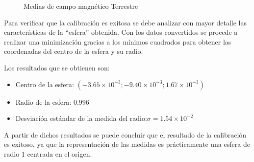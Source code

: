 \documentclass[main]{subfiles}
\begin{document}
\begin{figure}
  \begin{center}
  \end{center}
  \caption{Medias de campo magnético Terrestre}
\end{figure}

Para verificar que la calibraci\'on es exitosa se debe analizar con mayor detalle las caracter\'isticas de la ``esfera'' obtenida. Con los datos convertidos se procede a realizar una minimización gracias a los mínimos cuadrados para obtener las coordenadas del centro de la esfera y su radio.



Los resultados que se obtienen son:
\begin{itemize}
\item Centro de la esfera: $(-3.65\times10^{-3};-9.40\times10^{-3};1.67\times10^{-3})$
\item Radio de la esfera: $0.996$
\item Desviación estándar de la medida del radio:$\sigma = 1.54\times 10^{-2}$
\end{itemize}

A partir de dichos resultados se puede concluir que el resultado de la calibraci\'on es exitoso, ya que la representaci\'on de las medidas es pr\'acticamente una esfera de radio 1 centrada en el origen.
\end{document}
